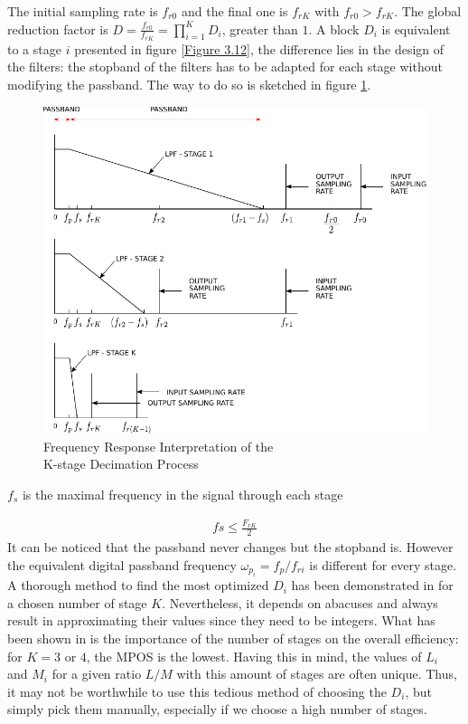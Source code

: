 \begin{itemize}
\begin{enumerate}
 	The initial sampling rate is $f_{r0}$ and the final one is $f_{rK}$ with  $f_{r0} > f_{rK}$. The global reduction factor is $D = \frac{f_{r0}}{f_{rK}} = \prod_{i=1}^{K} D_i$, greater than $1$. A block $D_i$ is equivalent to a stage $i$ presented in figure \ref{Figure 3.12}, the difference lies in the design of the filters: the stopband of the filters has to be adapted for each stage without modifying the passband. The way to do so is sketched in figure \ref{Figure 3.14}.\\
 	
 	\begin{figure}[ht!]
 		\centering
 		\hspace*{15mm}
 		\includegraphics[scale = 1]{multistage_sup1_2.pdf}
 		\caption{Frequency Response Interpretation of the \\K-stage Decimation Process}\label{Figure 3.14}
 	\end{figure}
 
 $f_s$ is the maximal frequency in the signal through each stage 
 
 \begin{align}
 	fs \leq \frac{F_{rK}}{2}
 \end{align}
 It can be noticed that the passband never changes but the stopband is. However the equivalent digital passband frequency $\omega_{p_i} = f_p/f_{ri}$ is different for every stage. A thorough method to find the most optimized $D_i$ has been demonstrated in \cite{crochiere} for a chosen number of stage $K$. Nevertheless, it depends on abacuses and always result in approximating their values since they need to be integers. What has been shown in \cite{turek} is the importance of the number of stages on the overall efficiency: for $K = 3$ or $4$, the MPOS is the lowest. Having this in mind, the values of $L_i$ and $M_i$ for a given ratio $L/M$ with this amount of stages are often unique. Thus, it may not be worthwhile to use this tedious method of choosing the $D_i$, but simply pick them manually, especially if we choose a high number of stages.\\
 	

\end{enumerate}
\end{itemize}
